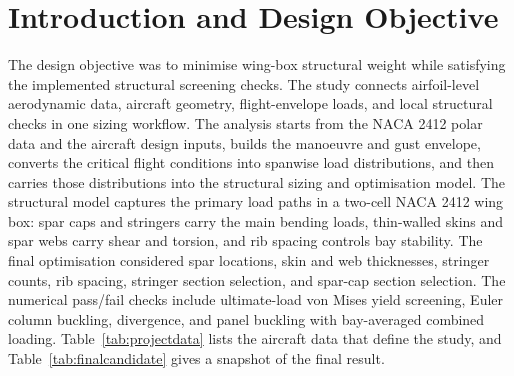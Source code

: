 \documentclass[11pt]{article}
\title{\projecttitle}
\author{Ignacio Garc\'ia Pere\~na}
\date{June 2026}
\begin{document}
\maketitle

\begin{abstract}
This report presents the structural sizing of a NACA 2412 wing box for a rectangular-wing, utility-category light aircraft, carried out as a personal engineering project. The workflow connects aircraft-level flight-envelope loads to local structural checks by generating the critical aerodynamic load cases, converting them into spanwise shear, bending, and torsional distributions, and evaluating the resulting stresses and stability margins along the wing. The structural model includes a two-cell wing-box idealisation with skins, spar webs, spar caps, stringers, and a geometric rib-weight model. A four-stage adaptive Monte Carlo optimisation selected the final design after evaluating 20,000 candidate designs across 13 design variables. The selected candidate is the lightest passing design found across all stages, with a reported structural weight of 449.45 lb including ribs and excluding miscellaneous detailed-design items. The design passes the implemented numerical checks for ultimate-load yield, Euler column buckling, divergence, and combined panel buckling.
\end{abstract}

\tableofcontents
\newpage

\section{Introduction and Design Objective}

The design objective was to minimise wing-box structural weight while satisfying the implemented structural screening checks. The study connects airfoil-level aerodynamic data, aircraft geometry, flight-envelope loads, and local structural checks in one sizing workflow. The analysis starts from the NACA 2412 polar data and the aircraft design inputs, builds the manoeuvre and gust envelope, converts the critical flight conditions into spanwise load distributions, and then carries those distributions into the structural sizing and optimisation model. The structural model captures the primary load paths in a two-cell NACA 2412 wing box: spar caps and stringers carry the main bending loads, thin-walled skins and spar webs carry shear and torsion, and rib spacing controls bay stability. The final optimisation considered spar locations, skin and web thicknesses, stringer counts, rib spacing, stringer section selection, and spar-cap section selection. The numerical pass/fail checks include ultimate-load von Mises yield screening, Euler column buckling, divergence, and panel buckling with bay-averaged combined loading. Table~\ref{tab:projectdata} lists the aircraft data that define the study, and Table~\ref{tab:finalcandidate} gives a snapshot of the final result.
\end{document}
